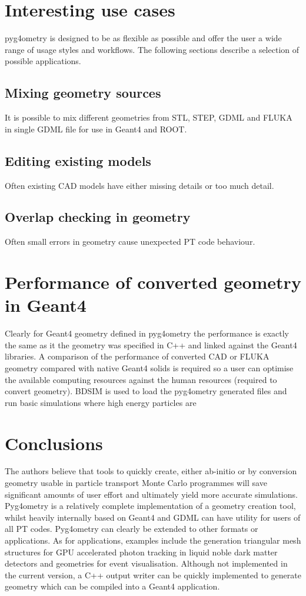 \documentclass[final,5p,times,twocolumn]{elsarticle}
\begin{document}
\section{Interesting use cases}
pyg4ometry is designed to be as flexible as possible and offer the user a wide range of usage styles and workflows. The following sections describe a selection of 
possible applications.

\subsection{Mixing geometry sources}
It is possible to mix different geometries from STL, STEP, GDML and FLUKA in single GDML file for use in Geant4 and ROOT. 

\subsection{Editing existing models}
Often existing CAD models have either missing details or too much detail. 

\subsection{Overlap checking in geometry}
Often small errors in geometry cause unexpected PT code behaviour.  


\section{Performance of converted geometry in Geant4}
Clearly for Geant4 geometry defined in pyg4ometry the performance is exactly the same as it the geometry was specified in C++ and linked against the Geant4
libraries. A comparison of the performance of converted CAD or FLUKA geometry compared with native Geant4 solids is required so a user can optimise the available
computing resources against the human resources (required to convert geometry). BDSIM is used to load the pyg4ometry generated files  and run basic simulations where 
high energy particles are   

\section{Conclusions}
The authors believe that tools to quickly create, either ab-initio or by conversion geometry usable in particle transport Monte Carlo programmes will save significant 
amounts of user effort and ultimately yield more accurate simulations. Pyg4ometry is a relatively complete implementation of a geometry creation tool, whilst heavily 
internally based on Geant4 and GDML can have utility for users of all PT codes. Pyg4ometry can clearly be extended to other formats or applications. As for applications,
examples include  the  generation triangular mesh structures for GPU accelerated photon tracking in liquid noble  dark matter detectors and geometries for event visualisation. 
Although not implemented in the current version, a C++ output writer can be quickly implemented to generate geometry which can be compiled into a Geant4 application. 
\end{document}
